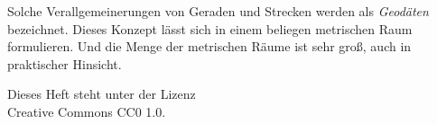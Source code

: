 \documentclass[a4paper,11pt,fleqn,twocolumn,twoside,dvipdfmx]{scrartcl}
\begin{document}
Solche Verallgemeinerungen von Geraden und Strecken werden als
\emph{Geodäten} bezeichnet. Dieses Konzept lässt sich in einem
beliegen metrischen Raum formulieren. Und die Menge der metrischen
Räume ist sehr groß, auch in praktischer Hinsicht.

\newpage\mbox{}
\vfill\noindent
Dieses Heft steht unter der Lizenz\\
Creative Commons CC0 1.0.
\end{document}

